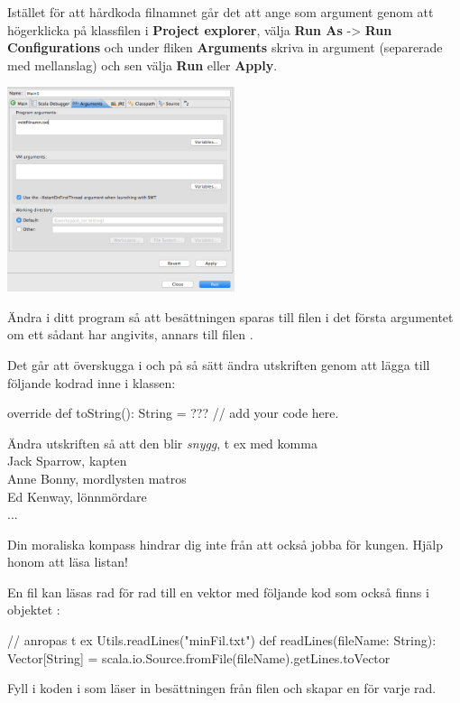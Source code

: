 Istället för att hårdkoda filnamnet går det att ange som argument genom att högerklicka på klassfilen i {\bf Project explorer}, välja {\bf Run As} -> {\bf Run Configurations} och under fliken {\bf Arguments} skriva in argument (separerade med mellanslag) och sen välja {\bf Run} eller {\bf Apply}. 
\begin{center}
\includegraphics[width=0.5\textwidth]{../img/pirates/args.png} \\
\end{center}

Ändra i ditt program så att besättningen sparas till filen i det första argumentet om ett sådant har angivits, annars till filen .

\Subtask Det går att överskugga  i  och på så sätt ändra utskriften genom att lägga till följande kodrad inne i klassen: 
\begin{Code}
override def toString(): String = ??? // add your code here. 
\end{Code}

\noindent Ändra utskriften så att den blir {\em snygg}, t ex med komma\\ 

\noindent Jack Sparrow, kapten \\
Anne Bonny, mordlysten matros \\
Ed Kenway, lönnmördare \\
... 
\newpage
{}

\Subtask Din moraliska kompass hindrar dig inte från att också jobba för kungen. Hjälp honom att läsa listan!

En fil  kan läsas rad för rad till en vektor med följande kod som också finns i objektet : 

\begin{Code}
// anropas t ex Utils.readLines("minFil.txt")
def readLines(fileName: String): Vector[String] = {
	   scala.io.Source.fromFile(fileName).getLines.toVector
	}
\end{Code}
Fyll i koden i  som läser in besättningen från filen och skapar en  för varje rad. 

